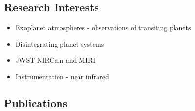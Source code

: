 \documentclass[11pt, oneside]{article}   	%
\begin{document}
\vspace{-0.2in}

\subsection*{Research Interests}
\begin{itemize}[noitemsep]
	\item Exoplanet atmospheres - observations of transiting planets
	\item Disintegrating planet systems
	\item JWST NIRCam and MIRI
	\item Instrumentation - near infrared
\end{itemize}
\vspace{-0.2in}

\subsection*{Publications}
\nocite{schlawin2018kic1255Normal}
\nocite{schlawin2018JWSTforecasts}
\nocite{schlawin2014}
\nocite{schlawin2017dhs}
\nocite{schlawin2017bdVar}
\nocite{greene2017jatisNIRCam}
\nocite{greene2016slitlessGrisms}
\nocite{schlawin2016kic1255}
\nocite{santerne2016ogle2011BLG-0417}
\nocite{stevenson2016ers}
\nocite{schlawin2010}
\nocite{schlawin2016kic1255}
\nocite{schlawin2014TSpec}
\nocite{muirheadKOI961}
\nocite{dale2009spitzerAnthology}
\nocite{west2011sloanMdwarf}
\nocite{muirhead2012}
\nocite{johnson2012}
\nocite{muirheadKOI961}
\nocite{muirhead2014coolKOIIV}

\begingroup
\renewcommand{\section}[2]{}%


\endgroup

%
%
\end{document}
